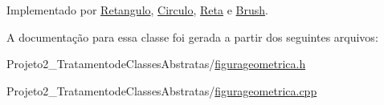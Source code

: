 Implementado por \mbox{\hyperlink{class_retangulo_ac088dd6d3f4f3d3f80363a868c2e74f1}{Retangulo}}, \mbox{\hyperlink{class_circulo_a593787d6e0618c2eded23e8839e7bea6}{Circulo}}, \mbox{\hyperlink{class_reta_ac2e9805183cd474b62bffd8b032cd780}{Reta}} e \mbox{\hyperlink{class_brush_ad12c371aba8d8770df593ef94ae14dd0}{Brush}}.



A documentação para essa classe foi gerada a partir dos seguintes arquivos\+:\begin{DoxyCompactItemize}
\item 
Projeto2\+\_\+\+Tratamentode\+Classes\+Abstratas/\mbox{\hyperlink{figurageometrica_8h}{figurageometrica.\+h}}\item 
Projeto2\+\_\+\+Tratamentode\+Classes\+Abstratas/\mbox{\hyperlink{figurageometrica_8cpp}{figurageometrica.\+cpp}}\end{DoxyCompactItemize}
